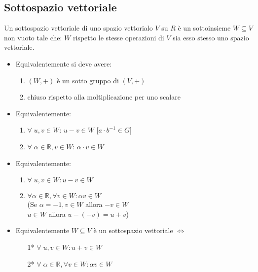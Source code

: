 \subsection{Sottospazio vettoriale}
Un sottospazio vettoriale di uno spazio vettorialo \(V\) su \(R\) è un sottoinsieme \(W\subseteq V\) non vuoto tale che: \(W\) rispetto le stesse operazioni di \(V\) sia esso stesso uno spazio vettoriale.
\\
\begin{itemize}

	\item Equivalentemente si deve avere:

	\begin{enumerate}

		\item \((W,+)\) è un sotto gruppo di \((V,+)\)

		\item chiuso rispetto alla moltiplicazione per uno scalare

	\end{enumerate}

	\item Equivalentemente:

	\begin{enumerate}

		\item \(\forall\;u,v\in W\): \(u-v\in W\)  [\(a\cdot b^{-1}\in G\)]

		\item \(\forall\;\alpha\in\mathbb{R},v\in W\): \(\alpha\cdot v\in W\)

	\end{enumerate}	

	\item Equivalentemente:

	\begin{enumerate}

		\item \(\forall\; u,v\in W: u-v\in W\)

		\item \(\forall\alpha\in\mathbb{R},\forall v\in W: \alpha v\in W\)
		\\(Se \(\alpha= -1,v\in W\) allora \(-v\in W\)
		\\\(u\in W\) allora \(u-(-v)=u+v\))
		
	\end{enumerate}

	\item Equivalentemente \(W\subseteq V\) è un sottospazio vettoriale \(\Leftrightarrow\)

	\begin{enumerate}

		\item [1*] \(\forall\;u,v\in W: u+v\in W\)

		\item [2*] \(\forall\;\alpha\in\mathbb{R},\forall v\in W: \alpha v\in W\)
		
	\end{enumerate}
	
\end{itemize}


